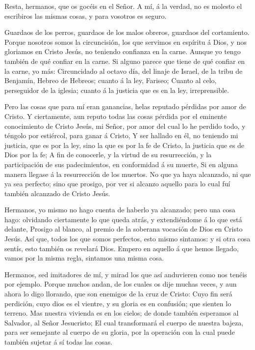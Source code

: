  Resta, hermanos, que os gocéis en el Señor. A mí, á la
verdad, no es molesto el escribiros las mismas cosas, y para vosotros es
seguro.

 Guardaos de los perros, guardaos de los malos obreros,
guardaos del cortamiento.  Porque nosotros somos la
circuncisión, los que servimos en espíritu á Dios, y nos gloriamos en
Cristo Jesús, no teniendo confianza en la carne.  Aunque yo
tengo también de qué confiar en la carne. Si alguno parece que tiene de
qué confiar en la carne, yo más:  Circuncidado al octavo
día, del linaje de Israel, de la tribu de Benjamín, Hebreo de Hebreos;
cuanto á la ley, Fariseo;  Cuanto al celo, perseguidor de la
iglesia; cuanto á la justicia que es en la ley, irreprensible.

 Pero las cosas que para mí eran ganancias, helas reputado
pérdidas por amor de Cristo.  Y ciertamente, aun reputo
todas las cosas pérdida por el eminente conocimiento de Cristo Jesús, mi
Señor, por amor del cual lo he perdido todo, y téngolo por estiércol,
para ganar á Cristo,  Y ser hallado en él, no teniendo mi
justicia, que es por la ley, sino la que es por la fe de Cristo, la
justicia que es de Dios por la fe;  A fin de conocerle, y
la virtud de su resurrección, y la participación de sus padecimientos,
en conformidad á su muerte,  Si en alguna manera llegase á
la resurrección de los muertos.  No que ya haya alcanzado,
ni que ya sea perfecto; sino que prosigo, por ver si alcanzo aquello
para lo cual fuí también alcanzado de Cristo Jesús.

 Hermanos, yo mismo no hago cuenta de haberlo ya alcanzado;
pero una cosa hago: olvidando ciertamente lo que queda atrás, y
extendiéndome á lo que está delante,  Prosigo al blanco, al
premio de la soberana vocación de Dios en Cristo Jesús. 
Así que, todos los que somos perfectos, esto mismo sintamos: y si otra
cosa sentís, esto también os revelará Dios.  Empero en
aquello á que hemos llegado, vamos por la misma regla, sintamos una
misma cosa.

 Hermanos, sed imitadores de mí, y mirad los que así
anduvieren como nos tenéis por ejemplo.  Porque muchos
andan, de los cuales os dije muchas veces, y aun ahora lo digo llorando,
que son enemigos de la cruz de Cristo:  Cuyo fin será
perdición, cuyo dios es el vientre, y su gloria es en confusión; que
sienten lo terreno.  Mas nuestra vivienda es en los cielos;
de donde también esperamos al Salvador, al Señor Jesucristo;
 El cual transformará el cuerpo de nuestra bajeza, para ser
semejante al cuerpo de su gloria, por la operación con la cual puede
también sujetar á sí todas las cosas.


